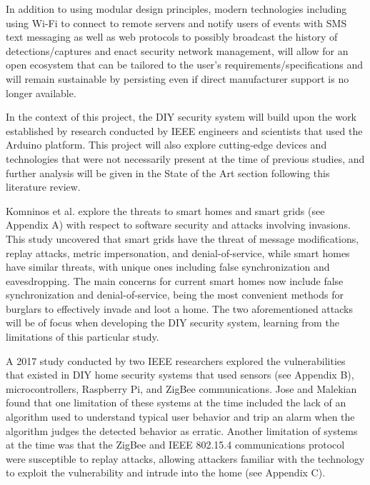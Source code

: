 \documentclass[conference]{IEEEtran}
\begin{document}
In addition to using modular design principles, modern technologies including using Wi-Fi
to connect to remote servers and notify users of events with SMS text messaging as well
as web protocols to possibly broadcast the history of detections/captures and enact
security network management, will allow for an open ecosystem that can be tailored
to the user’s requirements/specifications and will remain sustainable by persisting
even if direct manufacturer support is no longer available.

In the context of this project, the DIY security system will build upon the work
established by research conducted by IEEE engineers and scientists that used the
Arduino platform. This project will also explore cutting-edge devices and technologies
that were not necessarily present at the time of previous studies, and further analysis
will be given in the State of the Art section following this literature review.

Komninos et al. explore the threats to smart homes and smart grids (see Appendix A)
with respect to software security and attacks involving invasions. This study uncovered
that smart grids have the threat of message modifications, replay attacks, metric
impersonation, and denial-of-service, while smart homes have similar threats, with
unique ones including false synchronization and eavesdropping.\cite{komninosEtAl2014} The main concerns
for current smart homes now include false synchronization and denial-of-service, being
the most convenient methods for burglars to effectively invade and loot a home. The two
aforementioned attacks will be of focus when developing the DIY security system, learning
from the limitations of this particular study.

A 2017 study conducted by two IEEE researchers explored the vulnerabilities that
existed in DIY home security systems that used sensors (see Appendix B), microcontrollers,
Raspberry Pi, and ZigBee communications.\cite{joseMalekian2017} Jose and Malekian found that one limitation
of these systems at the time included the lack of an algorithm used to understand typical
user behavior and trip an alarm when the algorithm judges the detected behavior as
erratic. Another limitation of systems at the time was that the ZigBee and
IEEE 802.15.4 communications protocol were susceptible to replay attacks, allowing
attackers familiar with the technology to exploit the vulnerability and intrude into the
home (see Appendix C).\cite{joseMalekian2017}
\end{document}
